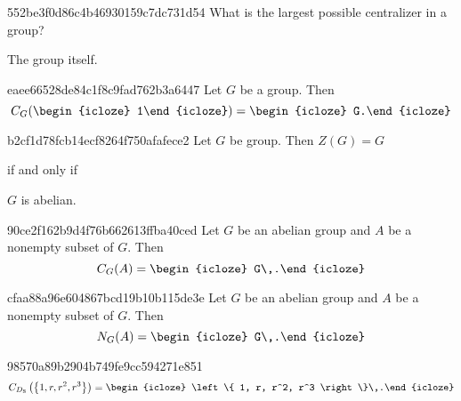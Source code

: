 \begin{note}{552be3f0d86c4b46930159c7dc731d54}
    What is the largest possible centralizer in a group?

    \begin{cloze}{1}
        The group itself.
    \end{cloze}
\end{note}

\begin{note}{eaee66528de84c1f8c9fad762b3a6447}
    Let \({ G }\) be a group. Then
    \[
        C_G(\begin{icloze}{2}1\end{icloze}) = \begin{icloze}{1}G.\end{icloze}
    \]
\end{note}

\begin{note}{b2cf1d78fcb14ecf8264f750afafece2}
    Let \({ G }\) be group.
    Then \({ Z(G) = G }\) \begin{icloze}{2}if and only if\end{icloze} \begin{icloze}{1}\({ G }\) is abelian.\end{icloze}
\end{note}

\begin{note}{90ce2f162b9d4f76b662613ffba40ced}
    Let \({ G }\) be an abelian group and \({ A }\) be a nonempty subset of \({ G }\).
    Then
    \[
        C_G(A) = \begin{icloze}{1}G\,.\end{icloze}
    \]
\end{note}

\begin{note}{cfaa88a96e604867bcd19b10b115de3e}
    Let \({ G }\) be an abelian group and \({ A }\) be a nonempty subset of \({ G }\).
    Then
    \[
        N_G(A) = \begin{icloze}{1}G\,.\end{icloze}
    \]
\end{note}

\begin{note}{98570a89b2904b749fe9cc594271e851}
    \[
        C_{D_8}\left( \left\{ 1, r, r^2, r^3 \right\} \right) = \begin{icloze}{1}\left\{ 1, r, r^2, r^3 \right\}\,.\end{icloze}
    \]
\end{note}


